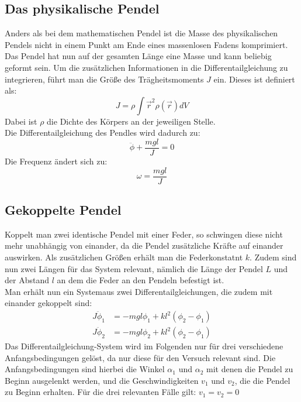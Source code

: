 \subsection{Das physikalische Pendel}
Anders als bei dem mathematischen Pendel ist die Masse des physikalischen Pendels nicht in einem Punkt am Ende eines massenlosen Fadens komprimiert.
Das Pendel hat nun auf der gesamten Länge eine Masse und kann beliebig geformt sein. Um die zusätzlichen Informationen in die Differentailgleichung
zu integrieren, führt man die Größe des Trägheitsmoments $J$ ein. Dieses ist definiert als:
\begin{equation}
    J=\rho\int{\vec{r}^2\rho(\vec{r})dV}
\end{equation}
Dabei ist $\rho$ die Dichte des Körpers an der jeweiligen Stelle.
\\
Die Differentailgleichung des Pendles wird dadurch zu:
\begin{equation}
    \ddot{\phi}+\frac{mgl}{J}=0
\end{equation}
Die Frequenz ändert sich zu:
\begin{equation}
    \omega=\frac{mgl}{J}
\end{equation}

\subsection{Gekoppelte Pendel}
Koppelt man zwei identische Pendel mit einer Feder, so schwingen diese nicht mehr unabhängig von einander, da die Pendel zusätzliche Kräfte auf 
einander auswirken. Als zusätzlichen Größen erhält man die Federkonstatnt $k$. Zudem sind nun zwei Längen für das System relevant, nämlich die 
Länge der Pendel $L$ und der Abstand $l$ an dem die Feder an den Pendeln befestigt ist. 
\\
Man erhält nun ein Systemaus zwei Differentailgleichungen, die zudem mit einander gekoppelt sind:
\begin{align}
    J\ddot{\phi}_1&=-mgl\phi_1+kl^2(\phi_2-\phi_1)\\
    J\ddot{\phi}_2&=-mgl\phi_2+kl^2(\phi_2-\phi_1)
\end{align}
Das Differentailgleichung-System wird im Folgenden nur für drei verschiedene Anfangsbedingungen gelöst, da nur diese für den Versuch relevant sind.
Die Anfangsbedingungen sind hierbei die Winkel $\alpha_1$ und $\alpha_2$ mit denen die Pendel zu Beginn ausgelenkt werden, und die Geschwindigkeiten
$v_1$ und $v_2$, die die Pendel zu Beginn erhalten. Für die drei relevanten Fälle gilt: $v_1=v_2=0$


